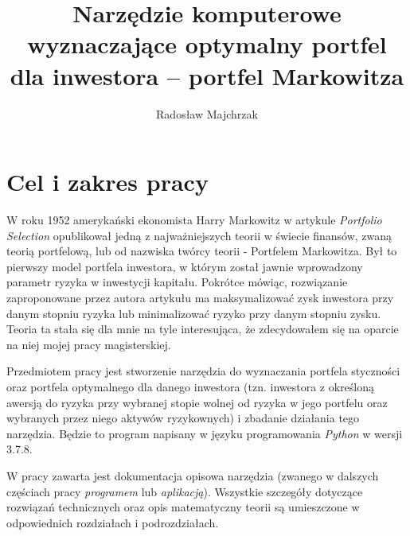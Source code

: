 \documentclass[magister]{dyplom}
\author{Radosław Majchrzak}\album{178640}
\title{Narzędzie komputerowe wyznaczające optymalny portfel dla inwestora – portfel Markowitza}
\date{}
\begin{document}

\linespread{1.3}
\tableofcontents


\chapter{Cel i zakres pracy}

W roku 1952 amerykański ekonomista Harry Markowitz w artykule \textit{Portfolio Selection} opublikował jedną z najważniejszych teorii w świecie finansów, zwaną teorią portfelową, lub od nazwiska twórcy teorii - Portfelem Markowitza. Był to pierwszy model portfela inwestora, w którym został jawnie wprowadzony parametr ryzyka w inwestycji kapitału\cite{wikipage}. Pokrótce mówiąc, rozwiązanie zaproponowane przez autora artykułu ma maksymalizować zysk inwestora przy danym stopniu ryzyka lub minimalizować ryzyko przy danym stopniu zysku. Teoria ta stała się dla mnie na tyle interesująca, że zdecydowałem się na oparcie na niej mojej pracy magisterskiej.\\\par
Przedmiotem pracy jest stworzenie narzędzia do wyznaczania portfela styczności oraz portfela optymalnego dla danego inwestora (tzn. inwestora z określoną awersją do ryzyka przy wybranej stopie wolnej od ryzyka w jego portfelu oraz wybranych przez niego aktywów ryzykownych) i zbadanie działania tego narzędzia.
Będzie to program napisany w języku programowania \textit{Python} w wersji 3.7.8.\\\par
W pracy zawarta jest dokumentacja opisowa narzędzia (zwanego w dalszych częściach pracy \textit{programem} lub \textit{aplikacją}). Wszystkie szczegóły dotyczące rozwiązań technicznych oraz opis matematyczny teorii są umieszczone w odpowiednich rozdziałach i podrozdziałach.\\\par
\end{document}
